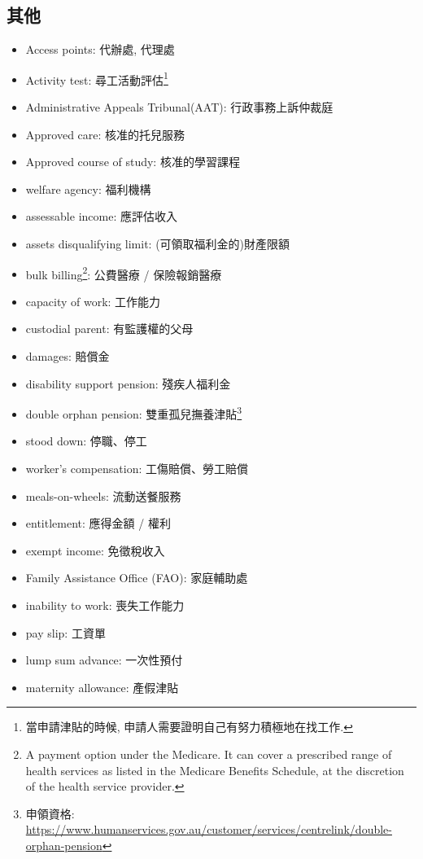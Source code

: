 \subsection*{其他}
\begin{multicols}{2}
\begin{itemize}
  \itemsep0em
  \item Access points: 代辦處, 代理處
  \item Activity test: 尋工活動評估\footnote{當申請津貼的時候, 申請人需要證明自己有努力積極地在找工作.}
  \item Administrative Appeals Tribunal(AAT): 行政事務上訴仲裁庭
  \item Approved care: 核准的托兒服務
  \item Approved course of study: 核准的學習課程
  \item welfare agency: 福利機構
  \item assessable income: 應評估收入
  \item assets disqualifying limit: (可領取福利金的)財產限額
  \item bulk billing\footnote{A payment option under the Medicare. It can cover a prescribed range of health services as listed in the Medicare Benefits Schedule, at the discretion of the health service provider.}: 公費醫療 / 保險報銷醫療
  \item capacity of work: 工作能力
  \item custodial parent: 有監護權的父母
  \item damages: 賠償金
  \item disability support pension: 殘疾人福利金
  \item double orphan pension: 雙重孤兒撫養津貼\footnote{申領資格: \url{https://www.humanservices.gov.au/customer/services/centrelink/double-orphan-pension}}
  \item stood down: 停職、停工
  \item worker's compensation: 工傷賠償、勞工賠償
  \item meals-on-wheels: 流動送餐服務
  \item entitlement: 應得金額 / 權利
  \item exempt income: 免徵稅收入
  \item Family Assistance Office (FAO): 家庭輔助處
  \item inability to work: 喪失工作能力
  \item pay slip: 工資單
  \item lump sum advance: 一次性預付
  \item maternity allowance: 產假津貼

\end{itemize}
\end{multicols}

